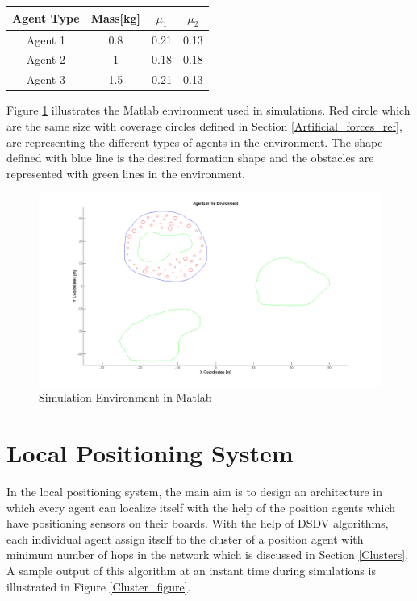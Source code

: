 \begin{center}
 \label{agent_props} 
\begin{tabular}{||c| c| c |c ||}
				
\hline
\textbf{Agent Type} & \textbf{Mass[kg]}  & \textbf{$\mu_1$} & \textbf{$\mu_2$}\\ 
\hline
Agent 1& 0.8 & 0.21  & 0.13 \\
Agent 2& 1   &  0.18 & 0.18 \\	
Agent 3& 1.5 &  0.21 & 0.13 \\	
\hline
\end{tabular}
\end{center}

Figure \ref{Matlab_env} illustrates the Matlab environment used in simulations. Red circle which are the same size with coverage circles defined in Section \ref{Artificial_forces_ref}, are representing the different types of agents in the environment. The shape defined with blue line is the desired formation shape and the obstacles are represented with green lines in the environment. 

\begin{figure}[H]
\caption{Simulation Environment in Matlab} \label{Matlab_env}
\centerline{\includegraphics[scale = 0.35]{2}}
\end{figure} 
    
\section{Local Positioning System}
In the local positioning system, the main aim is to design an architecture in which every agent can localize itself with the help of the position agents which have positioning sensors on their boards. With the help of DSDV algorithms, each individual agent assign itself to the cluster of a position agent with minimum number of hops in the network which is discussed in Section \ref{Clusters}. A sample output of this algorithm at an instant time during simulations is illustrated in Figure \ref{Cluster_figure}. 
	
